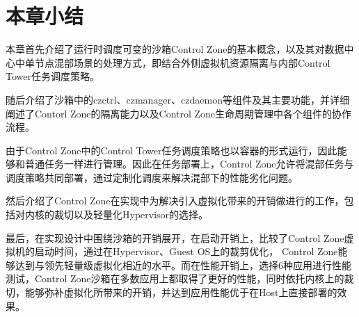 

\section{本章小结}

本章首先介绍了运行时调度可变的沙箱Control Zone的基本概念，以及其对数据中心中单节点混部场景的处理方式，即结合外侧虚拟机资源隔离与内部Control Tower任务调度策略。

随后介绍了沙箱中的czctrl、czmanager、czdaemon等组件及其主要功能，并详细阐述了Contorl Zone的隔离能力以及Control Zone生命周期管理中各个组件的协作流程。

由于Control Zone中的Control Tower任务调度策略也以容器的形式运行，因此能够和普通任务一样进行管理。因此在任务部署上，Control Zone允许将混部任务与调度策略共同部署，通过定制化调度来解决混部下的性能劣化问题。

然后介绍了Control Zone在实现中为解决引入虚拟化带来的开销做进行的工作，包括对内核的裁切以及轻量化Hypervisor的选择。

最后，在实现设计中围绕沙箱的开销展开，在启动开销上，比较了Control Zone虚拟机的启动时间，通过在Hypervisor、Guest OS上的裁剪优化， Control Zone能够达到与领先轻量级虚拟化相近的水平。而在性能开销上，选择6种应用进行性能测试，Control Zone沙箱在多数应用上都取得了更好的性能，同时依托内核上的裁切，能够弥补虚拟化所带来的开销，并达到应用性能优于在Host上直接部署的效果。